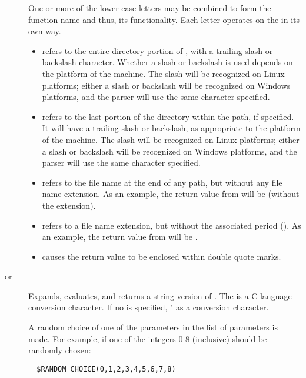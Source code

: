 \begin{description}
\item []
One or more of the lower case letters may be combined to form the
function name and thus, its functionality.
Each letter operates on the  in its own way.
\begin{itemize}
  \item {} refers to the entire directory portion of ,
with a trailing slash or backslash character.
Whether a slash or backslash is used depends on the platform of
the machine.
The slash will be recognized on Linux platforms;
either a slash or backslash will be recognized on Windows platforms,
and the parser will use the same character specified.
  \item {} refers to the last portion of the directory within the path,
if specified.
It will have a trailing slash or backslash, 
as appropriate to the platform of the machine.
The slash will be recognized on Linux platforms;
either a slash or backslash will be recognized on Windows platforms,
and the parser will use the same character specified.
  \item {} refers to the file name at the end of any path,
but without any file name extension.
As an  example, the return value from 
will be  (without the  extension).
  \item {} refers to a file name extension, but without the associated
period ().
As an  example, the return value from 
will be .
  \item {} causes the return value to be enclosed within double
quote marks.
\end{itemize}


\item [
       or ]
Expands, evaluates, and returns a string version of 
.
The  is a C language conversion character.
If no  is specified, \verb@"%d"@ is used
as a conversion character.

\item []
A random choice of one of the parameters in the list of parameters is made.
For example,
if one of the integers 0-8 (inclusive) should be randomly
chosen:
\begin{verbatim}
  $RANDOM_CHOICE(0,1,2,3,4,5,6,7,8)
\end{verbatim}


\end{description}
